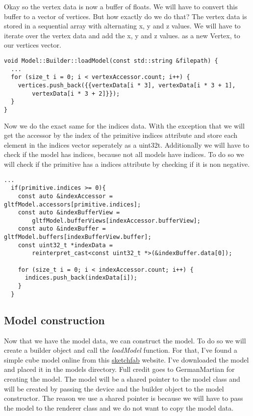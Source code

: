 \documentclass[12pt]{report} \usepackage{preamble}
\begin{document}
Okay so the vertex data is now a buffer of floats. We will have to convert this buffer to a vector of vertices. But how exactly do we do that?
The vertex data is stored in a sequential array with alternating x, y and z values. We will have to iterate over the vertex data and add the x, y and z values.
as a new Vertex, to our vertices vector.

\begin{lstlisting}[Language=C++]
void Model::Builder::loadModel(const std::string &filepath) {
  ...
  for (size_t i = 0; i < vertexAccessor.count; i++) {                                                                                                                                                 
    vertices.push_back({{vertexData[i * 3], vertexData[i * 3 + 1],                                                                   
        vertexData[i * 3 + 2]}});                                                                                                                                                                                
  }  
}
\end{lstlisting}

Now we do the exact same for the indices data. With the exception that we will get the accessor by the index of the primitive indices attribute and
store each element in the indices vector seperately as a uint32\textunderscore t. Additionally we will have to check if the model has indices, because
not all models have indices. To do so we will check if the primitive has a indices attribute by checking if it is non negative.

\begin{lstlisting}[Language=C++]
  ...
  if(primitive.indices >= 0){
    const auto &indexAccessor = gltfModel.accessors[primitive.indices];
    const auto &indexBufferView =
        gltfModel.bufferViews[indexAccessor.bufferView];
    const auto &indexBuffer = gltfModel.buffers[indexBufferView.buffer];
    const uint32_t *indexData =
        reinterpret_cast<const uint32_t *>(&indexBuffer.data[0]);

    for (size_t i = 0; i < indexAccessor.count; i++) {
      indices.push_back(indexData[i]);
    }
  }
\end{lstlisting}

\subsection{Model construction}

Now that we have the model data, we can construct the model. To do so we will create a builder object and call the \textit{loadModel} function.
For that, I've found a simple cube model online from this \href{https://sketchfab.com/3d-models/epic-simple-cube-3a180582490b4395bc6384ea2bb740aa}{sketchfab} website.
I've downloaded the model and placed it in the models directory. Full credit goes to German\textunderscore Martian \cite{German_Martian} for creating the model.
The model will be a shared pointer to the model class and will be created by passing the device and the builder object to the model constructor.
The reason we use a shared pointer is because we will have to pass the model to the renderer class and we do not want to copy the model data.
\end{document}
